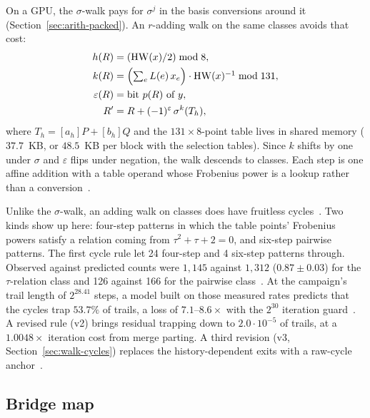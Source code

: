 On a GPU, the $\sigma$-walk pays for $\sigma^j$ in the basis
conversions around it (Section~\ref{sec:arith-packed}). An $r$-adding
walk on the same classes avoids that cost:
\begin{align*}
  h(R) &= (\operatorname{HW}(x)/2) \bmod 8,\\
  k(R) &= \Bigl(\textstyle\sum_e L(e)\,x_e\Bigr)\cdot \operatorname{HW}(x)^{-1} \bmod 131,\\
  \varepsilon(R) &= \text{bit $p(R)$ of } y,\\
  R' &= R + (-1)^{\varepsilon}\,\sigma^{k}(T_h),
\end{align*}
where $T_h=[a_h]P+[b_h]Q$ and the $131\times8$-point table lives in
shared memory ($37.7$~KB, or $48.5$~KB per block with the selection
tables). Since $k$ shifts by one under $\sigma$ and $\varepsilon$ flips
under negation, the walk descends to classes. Each step is one affine
addition with a table operand whose Frobenius power is a lookup
rather than a conversion~.

Unlike the $\sigma$-walk, an adding walk on classes does have
fruitless cycles~\cite{bls2011}. Two kinds show up here: four-step
patterns in which the table points' Frobenius powers satisfy a
relation coming from $\tau^2+\tau+2=0$, and six-step pairwise patterns.
The first cycle rule let 24 four-step and 4 six-step patterns through.
Observed against predicted counts were $1{,}145$ against $1{,}312$
($0.87\pm0.03$) for the $\tau$-relation class and 126 against 166 for
the pairwise class~. At the
campaign's trail length of $2^{28.41}$ steps, a model built on those
measured rates predicts that the cycles trap $53.7\%$ of trails, a
loss of $7.1$--$8.6\times$ with the $2^{30}$ iteration
guard~. A revised rule (v2) brings
residual trapping down to $2.0\cdot10^{-5}$ of trails, at a
$1.0048\times$ iteration cost from merge parting. A third revision (v3,
Section~\ref{sec:walk-cycles}) replaces the history-dependent exits
with a raw-cycle anchor~.

\subsection{Bridge map}
\label{sec:walk-bridge}

